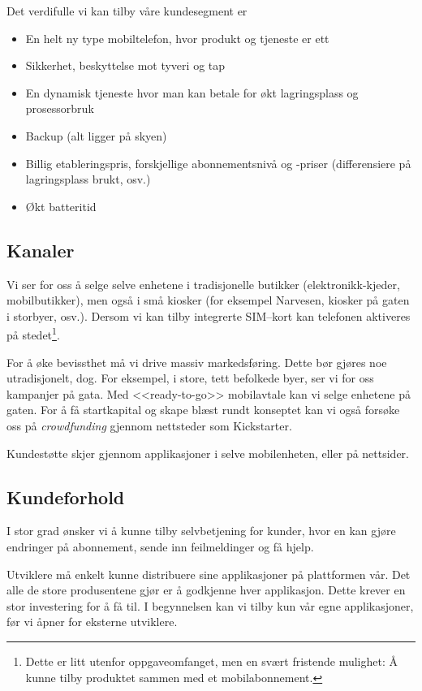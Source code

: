 Det verdifulle vi kan tilby våre kundesegment er
%
\begin{itemize}
  \item En helt ny type mobiltelefon, hvor produkt og tjeneste er ett
  \item Sikkerhet, beskyttelse mot tyveri og tap
  \item En dynamisk tjeneste hvor man kan betale for økt lagringsplass og
    prosessorbruk
  \item Backup (alt ligger på skyen)
  \item Billig etableringspris, forskjellige abonnementsnivå og
    -priser (differensiere på lagringsplass brukt, osv.)
  \item Økt batteritid
\end{itemize}

\subsection*{Kanaler}

Vi ser for oss å selge selve enhetene i tradisjonelle butikker
(elektronikk-kjeder, mobilbutikker), men også i små kiosker (for eksempel
Narvesen, kiosker på gaten i storbyer, osv.). Dersom vi kan tilby integrerte
SIM--kort kan telefonen aktiveres på stedet\footnote{Dette er litt utenfor
oppgaveomfanget, men en svært fristende mulighet: Å kunne tilby produktet
sammen med et mobilabonnement.}.

For å øke bevissthet må vi drive massiv markedsføring. Dette bør gjøres noe
utradisjonelt, dog. For eksempel, i store, tett befolkede byer, ser vi for oss
kampanjer på gata. Med <<ready-to-go>> mobilavtale kan vi selge enhetene på
gaten. For å få startkapital og skape blæst rundt konseptet kan vi også forsøke
oss på \textit{crowdfunding} gjennom nettsteder som Kickstarter.

Kundestøtte skjer gjennom applikasjoner i selve mobilenheten, eller på nettsider.

\subsection*{Kundeforhold}

I stor grad ønsker vi å kunne tilby selvbetjening for kunder, hvor en kan gjøre
endringer på abonnement, sende inn feilmeldinger og få hjelp.

Utviklere må enkelt kunne distribuere sine applikasjoner på plattformen vår.  Det alle
de store produsentene gjør er å godkjenne hver applikasjon. Dette krever en stor
investering for å få til.  I begynnelsen kan vi tilby kun vår egne applikasjoner, før vi
åpner for eksterne utviklere.

